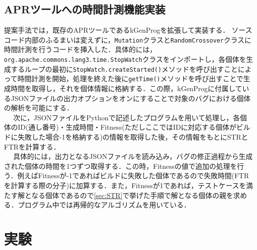 \documentclass[uplatex,dvipdfmx,a4paper]{jsarticle}
\let\oldcite\cite
\renewcommand{\cite}[1]{\xspace\oldcite{#1}}
\begin{document}
\subsection{APRツールへの時間計測機能実装} \label{sec:impl}
提案手法では，既存のAPRツールであるkGenProg\cite{higo2018kgenprog}を拡張して実装する．
ソースコード内部のふるまいは変えずに，\texttt{Mutation}クラスと\texttt{RandomCrossover}クラスに時間計測を行うコードを挿入した．具体的には，\texttt{org.apache.commons.lang3.time.StopWatch}クラスをインポートし，各個体を生成するループの最初に\texttt{StopWatch.createStarted()}メソッドを呼び出すことによって時間計測を開始，処理を終えた後に\texttt{getTime()}メソッドを呼び出すことで生成時間を取得し，それを個体情報に格納する．この際，kGenProgに付属しているJSONファイルの出力オプションをオンにすることで対象のバグにおける個体の解析を可能にする．\\　
次に，JSONファイルをPythonで記述したプログラムを用いて処理し，各個体のID(通し番号)・生成時間・Fitness(ただしここではIDに対応する個体がビルドに失敗した場合-1を格納する)の情報を取得した後，その情報をもとにSTRとFTRを計算する．\\　
具体的には，出力となるJSONファイルを読み込み，バグの修正過程から生成された個体の時間を1つずつ取得する．この時，Fitnessの値で追加の処理を行う．例えばFitnessが-1であればビルドに失敗した個体であるので失敗時間(FTRを計算する際の分子)に加算する．また，Fitnessが1であれば，テストケースを満たす解となる個体であるので\ref{sec:STR}で挙げた手順で解となる個体の親を求める．プログラム中では再帰的なアルゴリズムを用いている．
\clearpage
\section{実験} \label{sec:exp}
\end{document}
